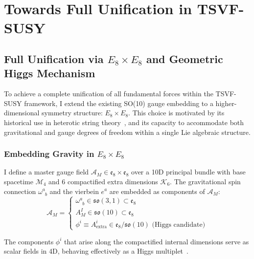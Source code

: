 \documentclass[twocolumn,superscriptaddress,floatfix]{revtex4-2}
\begin{document}
\section{Towards Full Unification in TSVF-SUSY}
\label{sec:E8unification}

\subsection{\texorpdfstring{Full Unification via \(E_8 \times E_8\) and Geometric Higgs Mechanism}{Full Unification via E8 x E8 and Geometric Higgs Mechanism}}
\label{subsec:E8unification_overview}

To achieve a complete unification of all fundamental forces within the TSVF-SUSY framework, I extend the existing SO(10) gauge embedding to a higher-dimensional symmetry structure: \(E_8 \times E_8\). This choice is motivated by its historical use in heterotic string theory~\cite{Gross1985}, and its capacity to accommodate both gravitational and gauge degrees of freedom within a single Lie algebraic structure.

\subsubsection{\texorpdfstring{Embedding Gravity in \(E_8 \times E_8\)}{Embedding Gravity in E8 x E8}}
\label{subsubsec:E8_embedding}

I define a master gauge field \(\mathcal{A}_M \in \mathfrak{e}_8 \times \mathfrak{e}_8\) over a 10D principal bundle with base spacetime \(\mathcal{M}_4\) and 6 compactified extra dimensions \(\mathcal{K}_6\). The gravitational spin connection \(\omega^a_{\phantom{a}b}\) and the vierbein \(e^a\) are embedded as components of \(\mathcal{A}_M\):
\begin{equation}
    \mathcal{A}_M = \begin{cases}
        \omega^a_{\phantom{a}b} \in \mathfrak{so}(3,1) \subset \mathfrak{e}_8 \\
        A^I_M \in \mathfrak{so}(10) \subset \mathfrak{e}_8 \\
        \phi^i \equiv A^i_{\text{extra}} \in \mathfrak{e}_8 / \mathfrak{so}(10) \text{ (Higgs candidate)}
    \end{cases}
    \label{eq:E8gaugefield}
\end{equation}

The components \(\phi^i\) that arise along the compactified internal dimensions serve as scalar fields in 4D, behaving effectively as a Higgs multiplet~\cite{Kaplan1984, Forgacs1980}.
\end{document}
